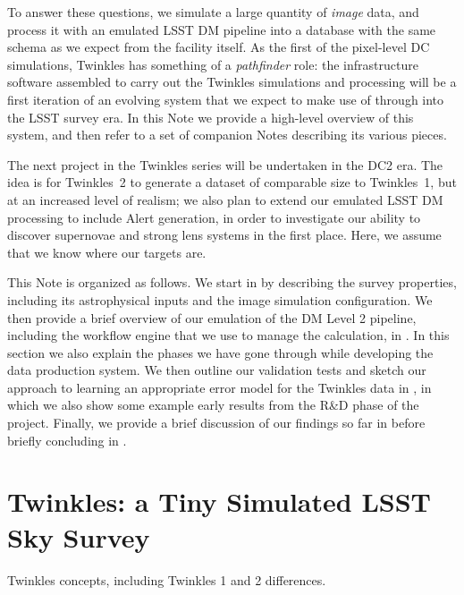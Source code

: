 \documentclass[\docopts]{\docclass}
\begin{document}
To answer these questions, we simulate a large quantity of {\it image} data, and process it with an emulated LSST DM pipeline into a database with the same schema as we expect from the facility itself.
As the first of the pixel-level DC simulations, Twinkles has something of a {\it pathfinder} role: the infrastructure software assembled to carry out the Twinkles simulations and processing will be a first iteration of an evolving system that we expect to make use of through into the LSST survey era.
In this Note we provide a high-level overview of this system, and then refer to a set of companion Notes describing its various pieces.

The next project in the Twinkles series will be undertaken in the DC2 era. The idea is for Twinkles~2 to generate a dataset of comparable size to Twinkles~1, but at an increased level of realism;
we also plan to extend our emulated LSST DM processing to include Alert generation, in order to investigate our ability to discover supernovae and strong lens systems in the first place. Here, we assume that we know where our targets are.

This Note is organized as follows.
We start in  by describing the survey properties, including its astrophysical inputs and the image simulation configuration.
We then provide a brief overview of our emulation of the DM Level 2 pipeline, including the workflow engine that we use to manage the calculation, in .
In this section we also explain the phases we have gone through while developing the data production system.
We then outline our validation tests and sketch our approach to learning an appropriate error model for the Twinkles data in , in which we also show some example early results from the R\&D phase of the project.
Finally, we provide a brief discussion of our findings so far in  before briefly concluding in .



\section{Twinkles: a Tiny Simulated LSST Sky Survey}
\label{sec:concepts}


Twinkles concepts, including Twinkles 1 and 2 differences.
\end{document}
